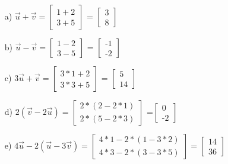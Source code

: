 \begin{itemize}
	\item [a) ] $\vec{u}+\vec{v} = \begin{bmatrix} 1+2 \\ 3+5 \end{bmatrix}$ = $\begin{bmatrix} 3\\ 8 \end{bmatrix}$
	\item [b) ] $\vec{u}-\vec{v} = \begin{bmatrix}1-2 \\ 3-5 \end{bmatrix}$ = $\begin{bmatrix}\text{-}1 \\ \text{-}2 \end{bmatrix}$
	\item [c) ] $3\vec{u}+\vec{v} = \begin{bmatrix} 3*1 + 2 \\ 3*3 + 5\end{bmatrix}$ = $\begin{bmatrix} 5 \\ 14\end{bmatrix}$
	\item [d) ] $2(\vec{v}-2\vec{u}) =\begin{bmatrix} 2*(2-2*1) \\ 2*(5-2*3)\end{bmatrix}$ =$\begin{bmatrix} 0 \\ \text{-}2\end{bmatrix}$
	\item [e) ] $4\vec{u}-2(\vec{u}-3\vec{v}) = \begin{bmatrix}4*1-2*(1-3*2) \\ 4*3-2*(3-3*5)\end{bmatrix} = \begin{bmatrix}14\\ 36\end{bmatrix}$
\end{itemize}
